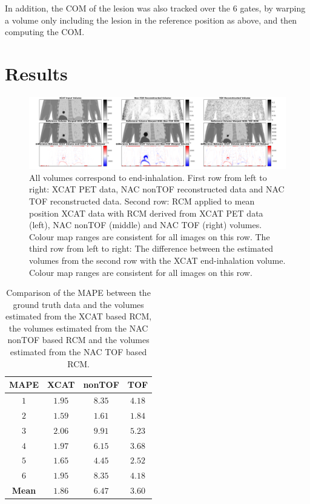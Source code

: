 \documentclass[10pt,twocolumn,twoside,letterpaper]{IEEEtran}
\begin{document}
In addition, the \gls{COM} of the lesion was also tracked over the $6$ gates, by warping a volume only including the lesion in the reference position as above, and then computing the \gls{COM}.
\section{Results}
\begin{figure}[h!]
    \centering
    \includegraphics[width=1.0\linewidth]{figures/output.png}
    \captionsetup{singlelinecheck=false, justification=centering}
    \caption{All volumes correspond to end-inhalation. First row from left to right: \gls{XCAT} \gls{PET} data, \gls{NAC} \gls{nonTOF} reconstructed data and \gls{NAC} \gls{TOF} reconstructed data. Second row: \gls{RCM} applied to mean position \gls{XCAT} data with \gls{RCM} derived from \gls{XCAT} \gls{PET} data (left), \gls{NAC} \gls{nonTOF} (middle) and \gls{NAC} \gls{TOF} (right) volumes. Colour map ranges are consistent for all images on this row. The third row from left to right: The difference between the estimated volumes from the second row with the \gls{XCAT} end-inhalation volume. Colour map ranges are consistent for all images on this row.}
    \label{fig:output}
\end{figure}

\begin{table}[H]
    \centering
    \captionsetup{singlelinecheck=false, justification=centering}
    \caption{Comparison of the \gls{MAPE} between the ground truth data and the volumes estimated from the \gls{XCAT} based \gls{RCM}, the volumes estimated from the \gls{NAC} \gls{nonTOF} based \gls{RCM} and the volumes estimated from the \gls{NAC} \gls{TOF} based \gls{RCM}.}
    
    \resizebox*{1.0\linewidth}{!}
    {
        \begin{tabular}{||c|ccc||}
        \hline
        \textbf{\gls{MAPE}} & \textbf{XCAT} & \textbf{\gls{nonTOF}} & \textbf{\gls{TOF}} \\
        \hline
        \textbf{$1$} & $1.95$ & $8.35$ & $4.18$ \\
        \textbf{$2$} & $1.59$ & $1.61$ & $1.84$ \\
        \textbf{$3$} & $2.06$ & $9.91$ & $5.23$ \\
        \textbf{$4$} & $1.97$ & $6.15$ & $3.68$ \\
        \textbf{$5$} & $1.65$ & $4.45$ & $2.52$ \\
        \textbf{$6$} & $1.95$ & $8.35$ & $4.18$ \\
        \hline
        \textbf{Mean} & $1.86$ & $6.47$ & $3.60$ \\
        \hline
    \end{tabular}
    }
    \label{tab:mape}
\end{table}
\end{document}
